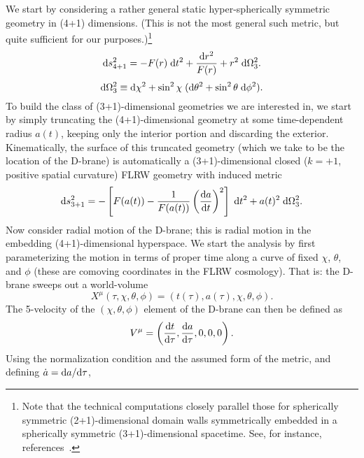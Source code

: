 \documentclass[a4paper,12pt]{article}
\begin{document}
We start by considering a rather general static hyper-spherically
symmetric geometry in (4+1) dimensions. (This is not the most general
such metric, but quite sufficient for our purposes.)\footnote{
Note that the technical computations closely parallel those for
spherically symmetric (2+1)-dimensional domain walls symmetrically
embedded in a spherically symmetric (3+1)-dimensional spacetime. See,
for instance, references~\cite{Book,Surgery,Brane-surgery}.}
%
\begin{equation}
\label{E:bulk}
{\mathrm d} s^2_{4+1} = - F(r) \; {\mathrm d} t^2 +{{\mathrm d} r^2\over F(r)} + r^2 \; {\mathrm d}\Omega_3^2.
\end{equation}
%
\begin{equation}
{\mathrm d}\Omega_3^2 \equiv {\mathrm d}\chi^2 + 
\sin^2\chi \; ({\mathrm d}\theta^2 + \sin^2\theta \; {\mathrm d}\phi^2).
\end{equation}
%
To build the class of (3+1)-dimensional geometries we are interested
in, we start by simply truncating the (4+1)-dimensional geometry at
some time-dependent radius $a(t)$, keeping only the interior portion
and discarding the exterior.  Kinematically, the surface of this
truncated geometry (which we take to be the location of the D-brane)
is automatically a (3+1)-dimensional closed ($k=+1$, positive spatial
curvature) FLRW geometry with induced metric
%
\begin{equation}
{\mathrm d} s^2_{3+1} = 
-
\left[ F(a(t)) - {1\over F(a(t))} \left({{\mathrm d} a\over{\mathrm d} t}\right)^2 \right]\; {\mathrm d} t^2 
+ a(t)^2  \; {\mathrm d}\Omega_3^2.
\end{equation}
%
Now consider radial motion of the D-brane; this is radial motion in
the embedding (4+1)-dimensional hyperspace. We start the analysis by
first parameterizing the motion in terms of proper time along a curve
of fixed $\chi$, $\theta$, and $\phi$ (these are comoving coordinates
in the FLRW cosmology). That is: the D-brane sweeps out a world-volume
%
\begin{equation}
X^\mu(\tau,\chi,\theta,\phi) = \left(t(\tau),a(\tau),\chi,\theta,\phi\right).
\end{equation}
%
The 5-velocity of the $(\chi,\theta,\phi)$ element of the D-brane can then
be defined as
%
\begin{equation}
V^\mu = \left({{\mathrm d} t \over{\mathrm d} \tau}, {{\mathrm d} a\over{\mathrm d}\tau},0,0,0\right).
\end{equation}
%
Using the normalization condition and the assumed form of the metric,
and defining $\dot a = {\mathrm d} a/{\mathrm d}\tau$,
\end{document}
